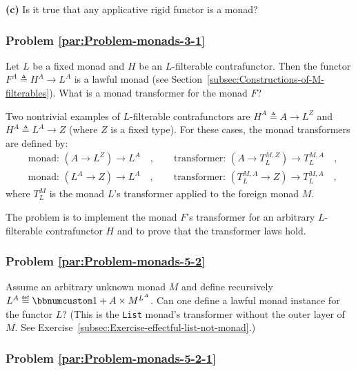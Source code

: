 \textbf{(c)} Is it true that any applicative rigid functor is a monad?

\subsubsection{Problem \label{par:Problem-monads-3-1}\ref{par:Problem-monads-3-1}}

Let $L$ be a fixed monad and $H$ be an $L$-filterable contrafunctor.
Then the functor $F^{A}\triangleq H^{A}\rightarrow L^{A}$ is a lawful
monad (see Section~\ref{subsec:Constructions-of-M-filterables}).
What is a monad transformer for the monad $F$? 

Two nontrivial examples of $L$-filterable contrafunctors are $H^{A}\triangleq A\rightarrow L^{Z}$
and $H^{A}\triangleq L^{A}\rightarrow Z$ (where $Z$ is a fixed type).
For these cases, the monad transformers are defined by:
\begin{align*}
 & \text{monad: }(A\rightarrow L^{Z})\rightarrow L^{A}\quad,\quad\quad\text{transformer: }(A\rightarrow T_{L}^{M,Z})\rightarrow T_{L}^{M,A}\quad,\\
 & \text{monad: }(L^{A}\rightarrow Z)\rightarrow L^{A}\quad,\quad\quad\text{transformer: }(T_{L}^{M,A}\rightarrow Z)\rightarrow T_{L}^{M,A}\quad,
\end{align*}
where $T_{L}^{M}$ is the monad $L$\textsf{'}s transformer applied to the
foreign monad $M$.

The problem is to implement the monad $F$\textsf{'}s transformer for an arbitrary
$L$-filterable contrafunctor $H$ and to prove that the transformer
laws hold.

\subsubsection{Problem \label{par:Problem-monads-5-2}\ref{par:Problem-monads-5-2}}

Assume an arbitrary unknown monad $M$ and define recursively $L^{A}\triangleq\bbnum 1+A\times M^{L^{A}}$.
Can one define a lawful monad instance for the functor $L$? (This
is the \lstinline!List! monad\textsf{'}s transformer without the outer layer
of $M$. See Exercise~\ref{subsec:Exercise-effectful-list-not-monad}.)

\subsubsection{Problem \label{par:Problem-monads-5-2-1}\ref{par:Problem-monads-5-2-1}}

